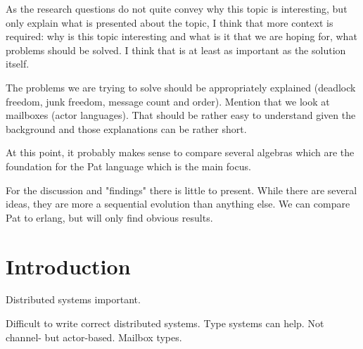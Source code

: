 As the research questions do not quite convey why this topic is interesting, but only explain what is presented about the topic, I think that more context is required: why is this topic interesting and what is it that we are hoping for, what problems should be solved. I think that is at least as important as the solution itself.

The problems we are trying to solve should be appropriately explained (deadlock freedom, junk freedom, message count and order). Mention that we look at mailboxes (actor languages). That should be rather easy to understand given the background and those explanations can be rather short.

At this point, it probably makes sense to compare several algebras which are the foundation for the Pat language which is the main focus.





For the discussion and "findings" there is little to present. While there are several ideas, they are more a sequential evolution than anything else. We can compare Pat to erlang, but will only find obvious results.

\section{Introduction}
\label{sec:introduction}



Distributed systems important.

Difficult to write correct distributed systems. Type systems can help. Not channel- but actor-based. Mailbox types.

